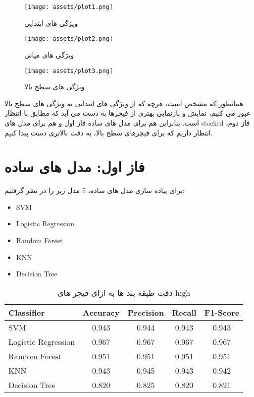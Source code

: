 \documentclass[a4paper,12pt]{article}
\begin{document}
\begin{figure}[h]
	\centering
	\texttt{[image: assets/plot1.png]}
	\caption{\textcolor{CustomAccent}{ویژگی های ابتدایی}}
\end{figure}

\begin{figure}[h]
	\centering
	\texttt{[image: assets/plot2.png]}
	\caption{\textcolor{CustomAccent}{ویژگی های میانی}}
\end{figure}

\begin{figure}[h]
	\centering
	\texttt{[image: assets/plot3.png]}
	\caption{\textcolor{CustomAccent}{ویژگی های سطح بالا}}
\end{figure}

همانطور که مشخص است، هرچه که از ویژگی های ابتدایی به ویژگی های سطح بالا عبور می کنیم، نمایش و بازنمایی بهتری از فیچرها به دست می آید که مطابق با انتظار است. بنابراین هم برای مدل های ساده فاز اول و هم برای مدل های stacked فاز دوم، انتظار داریم که برای فیچرهای سطح بالا، به دقت بالاتری دست پیدا کنیم. 


\pagebreak
\section*{فاز اول: مدل های ساده}
برای پیاده سازی مدل های ساده، 5 مدل زیر را در نظر گرفتیم:
\begin{latin}
\begin{itemize}
	\item SVM
	\item Logistic Regression
	\item Random Forest
	\item KNN
	\item Decision Tree
\end{itemize}
\end{latin}

\begin{table}[h]
	\centering
	\begin{latin}
	\begin{tabular}{|l|c|c|c|c|}
		\hline
		 \textbf{Classifier} & \textbf{Accuracy} & \textbf{Precision} & \textbf{Recall} & \textbf{F1-Score} \\
		\hline
		 SVM & 0.943 & 0.944 & 0.943 & 0.943 \\
		\hline
		 Logistic Regression & 0.967 & 0.967 & 0.967 & 0.967 \\
		\hline
		 Random Forest & 0.951 & 0.951 & 0.951 & 0.951 \\
		\hline
		 KNN & 0.943 & 0.945 & 0.943 & 0.942 \\
		\hline
		 Decision Tree & 0.820 & 0.825 & 0.820 & 0.821 \\
		\hline
	\end{tabular}
	\end{latin}
	\caption{دقت طبقه بند ها به ازای فیچر های high}
	\label{tab:classifier_performance}
\end{table}
\end{document}
